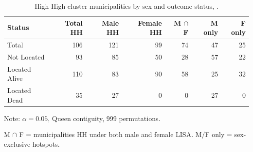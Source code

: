 \begin{table}[htbp]
\centering
\caption{High-High cluster municipalities by sex and outcome status, .}\label{tab:sex}
\begin{tabular}{lrrrrrr}
  \toprule
  \textbf{Status} & \textbf{Total HH} & \textbf{Male HH} & \textbf{Female HH} & \textbf{M $\cap$ F} & \textbf{M only} & \textbf{F only} \\
  \midrule
  Total & 106 & 121 & 99 & 74 & 47 & 25 \\
  Not Located & 93 & 85 & 50 & 28 & 57 & 22 \\
  Located Alive & 110 & 83 & 90 & 58 & 25 & 32 \\
  Located Dead & 35 & 27 & 0 & 0 & 27 & 0 \\
  \bottomrule
\end{tabular}
\begin{tablenotes}
\small
\item Note: $\alpha=0.05$, Queen contiguity, 999 permutations.
\item M $\cap$ F = municipalities HH under both male and female LISA. M/F only = sex-exclusive hotspots.
\end{tablenotes}
\end{table}
